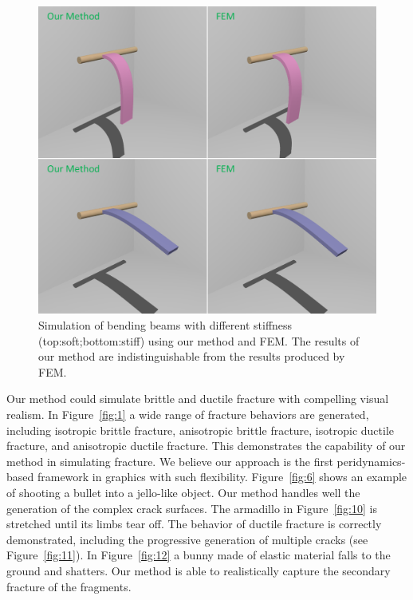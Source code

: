 \begin{figure}[t]
  \centering
  \includegraphics[width=\linewidth]{./figs/demo_strip_vs_fem.png}
  \caption{\label{fig:9}
  Simulation of bending beams with different stiffness (top:soft;bottom:stiff) using our method and FEM. The results of our method are indistinguishable from the results produced by FEM.
}
\end{figure}

 Our method could simulate brittle and ductile fracture with compelling visual realism. In Figure~\ref{fig:1} a wide range of fracture behaviors are generated, including isotropic brittle fracture, anisotropic brittle fracture, isotropic ductile fracture, and anisotropic ductile fracture. This demonstrates the capability of our method in simulating fracture. We believe our approach is the first peridynamics-based framework in graphics with such flexibility. Figure~\ref{fig:6} shows an example of shooting a bullet into a jello-like object. Our method handles well the generation of the complex crack surfaces. The armadillo in Figure~\ref{fig:10} is stretched until its limbs tear off. The behavior of ductile fracture is correctly demonstrated, including the progressive generation of multiple cracks (see Figure~\ref{fig:11}). In Figure~\ref{fig:12} a bunny made of elastic material falls to the ground and shatters. Our method is able to realistically capture the secondary fracture of the fragments.

